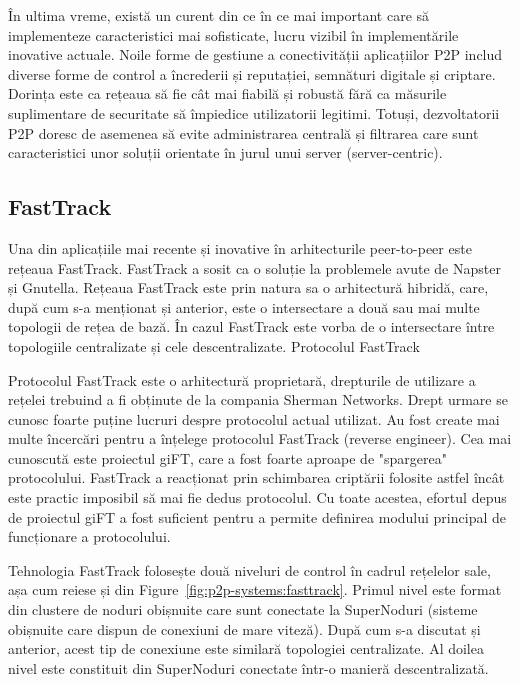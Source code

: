 În ultima vreme, există un curent din ce în ce mai important care să
implementeze caracteristici mai sofisticate, lucru vizibil în implementările
inovative actuale. Noile forme de gestiune a conectivității aplicațiilor P2P
includ diverse forme de control a încrederii și reputației, semnături digitale
și criptare. Dorința este ca rețeaua să fie cât mai fiabilă și robustă fără ca
măsurile suplimentare de securitate să împiedice utilizatorii legitimi.
Totuși, dezvoltatorii P2P doresc de asemenea să evite administrarea centrală
și filtrarea care sunt caracteristici unor soluții orientate în jurul unui
server (server-centric).

\subsection{FastTrack}

Una din aplicațiile mai recente și inovative în arhitecturile peer-to-peer
este rețeaua FastTrack. FastTrack a sosit ca o soluție la problemele avute de
Napster și Gnutella. Rețeaua FastTrack este prin natura sa o arhitectură
hibridă, care, după cum s-a menționat și anterior, este o intersectare a două
sau mai multe topologii de rețea de bază. În cazul FastTrack este vorba de o
intersectare între topologiile centralizate și cele descentralizate.
Protocolul FastTrack

Protocolul FastTrack este o arhitectură proprietară, drepturile de utilizare a
rețelei trebuind a fi obținute de la compania Sherman Networks. Drept urmare
se cunosc foarte puține lucruri despre protocolul actual utilizat. Au fost
create mai multe încercări pentru a înțelege protocolul FastTrack (reverse
engineer). Cea mai cunoscută este proiectul giFT, care a fost foarte aproape
de "spargerea" protocolului. FastTrack a reacționat prin schimbarea criptării
folosite astfel încât este practic imposibil să mai fie dedus protocolul. Cu
toate acestea, efortul depus de proiectul giFT a fost suficient pentru a
permite definirea modului principal de funcționare a protocolului.

Tehnologia FastTrack folosește două niveluri de control în cadrul rețelelor
sale, așa cum reiese și din Figure~\ref{fig:p2p-systems:fasttrack}. Primul
nivel este format din clustere de noduri obișnuite care sunt conectate la
SuperNoduri (sisteme obișnuite care dispun de conexiuni de mare viteză). După
cum s-a discutat și anterior, acest tip de conexiune este similară topologiei
centralizate. Al doilea nivel este constituit din SuperNoduri conectate într-o
manieră descentralizată.

